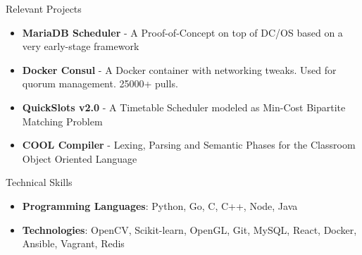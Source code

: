 \documentclass{resume}
\begin{document}
\begin{rSection}{Relevant Projects}
  \begin{itemize}[label={},topsep=0pt,itemsep=-0.5ex,partopsep=1ex,parsep=1ex,leftmargin=0.25em]
  \item {\bf MariaDB Scheduler} - A Proof-of-Concept on top of DC/OS based on a very early-stage framework
  \item  {\bf Docker Consul} - A Docker container with networking tweaks. Used for quorum management. 25000+ pulls.
  \item {\bf QuickSlots v2.0} - A Timetable Scheduler modeled as Min-Cost Bipartite Matching Problem
  \item {\bf COOL Compiler} - Lexing, Parsing and Semantic Phases for the Classroom Object Oriented Language
  \end{itemize}
\end{rSection}

\begin{rSection}{Technical Skills}

  \begin{itemize}[label={},topsep=0pt,itemsep=-0.5ex,partopsep=1ex,parsep=1ex,leftmargin=0.25em]
  \item  {\bf Programming Languages}: Python, Go, C, C++, Node, Java
  \item {\bf Technologies}: OpenCV, Scikit-learn, OpenGL, Git, MySQL, React, Docker, Ansible, Vagrant, Redis
  \end{itemize}

\end{rSection}
\end{document}
